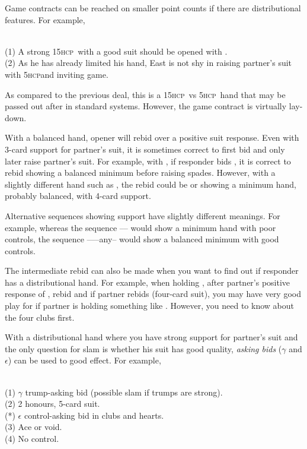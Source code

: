 \documentclass[a4paper,article,oneside]{memoir}
\newcommand{\gap}{\vspace{\baselineskip}}
\newcommand{\hcp}{\textsc{hcp}}
\begin{document}
\gap

Game contracts can be reached on smaller point counts if there are
distributional features. For example,

 \\ (1) A strong 15\hcp\ with a good
suit should be opened with .\\ (2) As he has already limited his
hand, East is not shy in raising partner's suit with 5\hcp and
inviting game.

As compared to the previous deal, this is a 15\hcp\ vs 5\hcp\ hand
that may be passed out after  in standard systems. However, the
game contract is virtually lay-down.

\gap

With a balanced hand, opener will rebid \Nt{} over a positive suit
response.  Even with 3-card support for partner's suit, it is
sometimes correct to first bid \Nt{} and only later raise partner's
suit. For example, with , if responder bids
, it is correct to rebid  showing a balanced minimum
before raising spades. However, with a slightly different hand such as
, the rebid could be  or  showing
a minimum hand, probably balanced, with 4-card support.

Alternative sequences showing support have slightly different
meanings.  For example, whereas the sequence ----
would show a minimum hand with poor controls, the sequence
------any-- would show a balanced minimum with
good controls.

The intermediate  rebid can also be made when you want to find
out if responder has a distributional hand. For example, when holding
, after partner's positive response of ,
rebid  and if partner rebids  (four-card suit), you may
have very good play for  if partner is holding something like
.  However, you need to know about the four
clubs first.

\gap

With a distributional hand where you have strong support for partner's
suit and the only question for slam is whether his suit has good
quality, \emph{asking bids} ($\gamma$ and $\epsilon$) can be used to
good effect. For example,

 \\
(1) $\gamma$ trump-asking bid (possible slam if trumps are strong). \\
(2) 2 honours, 5-card suit. \\ (*) $\epsilon$ control-asking bid in
clubs and hearts. \\ (3) Ace or void. \\ (4) No control.
\end{document}
